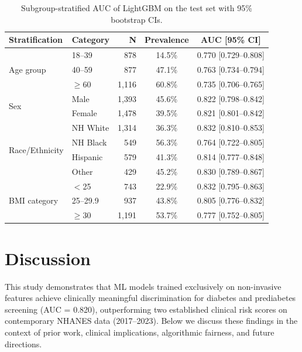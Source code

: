 \documentclass{amia}
\begin{document}
\begin{table}[H]
\caption{Subgroup-stratified AUC of LightGBM on the test set with 95\% bootstrap CIs.}
\label{tab:subgroup}
\begin{center}
\footnotesize
\begin{tabular}{llrcc}
\toprule
\textbf{Stratification} & \textbf{Category} & \textbf{N} & \textbf{Prevalence} & \textbf{AUC [95\% CI]} \\
\midrule
\multirow{3}{*}{Age group} & 18--39 & 878 & 14.5\% & 0.770 [0.729--0.808] \\
 & 40--59 & 877 & 47.1\% & 0.763 [0.734--0.794] \\
 & $\geq$60 & 1,116 & 60.8\% & 0.735 [0.706--0.765] \\
\midrule
\multirow{2}{*}{Sex} & Male & 1,393 & 45.6\% & 0.822 [0.798--0.842] \\
 & Female & 1,478 & 39.5\% & 0.821 [0.801--0.842] \\
\midrule
\multirow{4}{*}{Race/Ethnicity} & NH White & 1,314 & 36.3\% & 0.832 [0.810--0.853] \\
 & NH Black & 549 & 56.3\% & 0.764 [0.722--0.805] \\
 & Hispanic & 579 & 41.3\% & 0.814 [0.777--0.848] \\
 & Other & 429 & 45.2\% & 0.830 [0.789--0.867] \\
\midrule
\multirow{3}{*}{BMI category} & $<$25 & 743 & 22.9\% & 0.832 [0.795--0.863] \\
 & 25--29.9 & 937 & 43.8\% & 0.805 [0.776--0.832] \\
 & $\geq$30 & 1,191 & 53.7\% & 0.777 [0.752--0.805] \\
\bottomrule
\end{tabular}
\end{center}
\end{table}

\section*{Discussion}

This study demonstrates that ML models trained exclusively on non-invasive features achieve clinically meaningful discrimination for diabetes and prediabetes screening (AUC = 0.820), outperforming two established clinical risk scores on contemporary NHANES data (2017--2023). Below we discuss these findings in the context of prior work, clinical implications, algorithmic fairness, and future directions.
\end{document}
